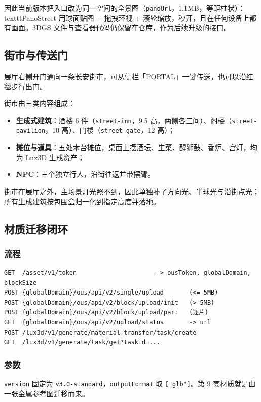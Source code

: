 \documentclass[UTF8,a4paper,11pt]{ctexart}
\begin{document}
因此当前版本把入口改为同一空间的全景图（\texttt{panoUrl}，1.1MB，等距柱状）：\\texttt{PanoStreet} 用球面贴图 + 拖拽环视 + 滚轮缩放，秒开，且在任何设备上都有画面。3DGS 文件与查看器代码仍保留在仓库，作为后续升级的接口。

\subsection{街市与传送门}

展厅右侧开门通向一条长安街市，可从侧栏「PORTAL」一键传送，也可以沿红毯步行出门。

街市由三类内容组成：
\begin{itemize}[itemsep=2pt]
  \item \textbf{生成式建筑}：酒楼 6 件（\texttt{street-inn}，9.5 高，两侧各三间）、阁楼（\texttt{street-pavilion}，10 高）、门楼（\texttt{street-gate}，12 高）；
  \item \textbf{摊位与道具}：五处木台摊位，桌面上摆酒坛、生菜、醒狮鼓、香炉、宫灯，均为 Lux3D 生成资产；
  \item \textbf{NPC}：三个独立行人，沿街往返并带摆臂。
\end{itemize}

街市在展厅之外，主场景灯光照不到，因此单独补了方向光、半球光与沿街点光；所有生成建筑按包围盒归一化到指定高度并落地。


\subsection{材质迁移闭环}

\subsubsection{流程}
\begin{lstlisting}
GET  /asset/v1/token                      -> ousToken, globalDomain, blockSize
POST {globalDomain}/ous/api/v2/single/upload       (<= 5MB)
POST {globalDomain}/ous/api/v2/block/upload/init   (> 5MB)
POST {globalDomain}/ous/api/v2/block/upload/part   (逐片)
GET  {globalDomain}/ous/api/v2/upload/status       -> url
POST /lux3d/v1/generate/material-transfer/task/create
GET  /lux3d/v1/generate/task/get?taskid=...
\end{lstlisting}

\subsubsection{参数}
\texttt{version} 固定为 \texttt{v3.0-standard}，\texttt{outputFormat} 取 \texttt{["glb"]}。第 9 套材质就是由一张金属参考图迁移而来。
\end{document}
